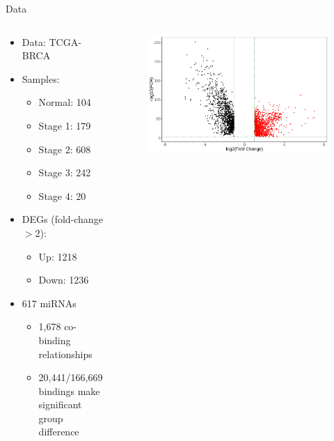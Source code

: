 \documentclass{beamer}
\begin{document}
\begin{frame}{Data}
	\begin{columns}
		\begin{column}{.48\textwidth}
			\begin{itemize}
				\item Data: TCGA-BRCA
				\item Samples:
				      \begin{itemize}
					      \item Normal: 104
					      \item Stage 1: 179
					      \item Stage 2: 608
					      \item Stage 3: 242
					      \item Stage 4: 20
				      \end{itemize}
				\item DEGs (fold-change $> 2$):
				      \begin{itemize}
					      \item Up: 1218
					      \item Down: 1236
				      \end{itemize}
				\item 617 miRNAs
				      \begin{itemize}
					      \item 1,678 co-binding relationships
					      \item 20,441/166,669 bindings make significant group difference
				      \end{itemize}
			\end{itemize}
		\end{column}

		\begin{column}{.48\textwidth}
			\begin{figure}[ht]
				\centering
				\includegraphics[width=1\textwidth, height=0.7\textheight]{img/diff-genes-volcano.png}
				\caption*{\label{fig:volcano}}
			\end{figure}
		\end{column}
	\end{columns}
\end{frame}
\end{document}
